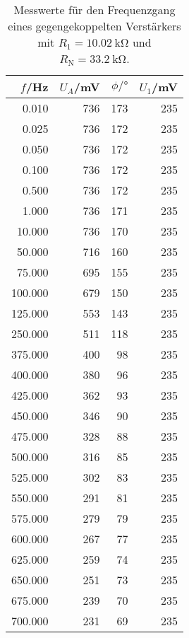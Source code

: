 \begin{table}
  \centering
\begin{tabular}{rrrr}
      $f$/Hz &  $U_A$/mV &  $\phi/\si{\degree}$ &  $U_1$/mV \\
\midrule
   0.010 &  736 &  173 &  235 \\
   0.025 &  736 &  172 &  235 \\
   0.050 &  736 &  172 &  235 \\
   0.100 &  736 &  172 &  235 \\
   0.500 &  736 &  172 &  235 \\
   1.000 &  736 &  171 &  235 \\
  10.000 &  736 &  170 &  235 \\
  50.000 &  716 &  160 &  235 \\
  75.000 &  695 &  155 &  235 \\
 100.000 &  679 &  150 &  235 \\
 125.000 &  553 &  143 &  235 \\
 250.000 &  511 &  118 &  235 \\
 375.000 &  400 &   98 &  235 \\
 400.000 &  380 &   96 &  235 \\
 425.000 &  362 &   93 &  235 \\
 450.000 &  346 &   90 &  235 \\
 475.000 &  328 &   88 &  235 \\
 500.000 &  316 &   85 &  235 \\
 525.000 &  302 &   83 &  235 \\
 550.000 &  291 &   81 &  235 \\
 575.000 &  279 &   79 &  235 \\
 600.000 &  267 &   77 &  235 \\
 625.000 &  259 &   74 &  235 \\
 650.000 &  251 &   73 &  235 \\
 675.000 &  239 &   70 &  235 \\
 700.000 &  231 &   69 &  235 \\
\end{tabular}
\caption{Messwerte für den Frequenzgang eines gegengekoppelten Verstärkers mit $R_1 = \SI{10.02}{\kilo\ohm}$ und $R_\text{N} = \SI{33.2}{\kilo\ohm}$.}
\end{table}

